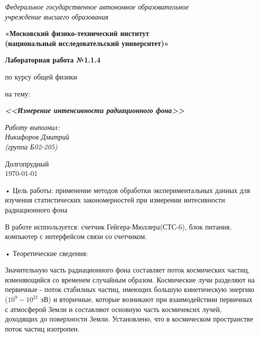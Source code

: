 \documentclass[a4paper,14pt]{extarticle}
\begin{document}
\begin{center}
	\textit{Федеральное государственное автономное образовательное\\ учреждение высшего образования }
	
	\vspace{0.5ex}
	
	\textbf{«Московский физико-технический институт\\ (национальный исследовательский университет)»}
\end{center}

\vspace{10ex}


\begin{center}
	\vspace{13ex}
	
	\textbf{Лабораторная работа №1.1.4}
	
	\vspace{1ex}
	
	по курсу общей физики
	
	на тему:
	
	\textbf{\textit{<<Измерение интенсивности радиационного фона>>}}
	
	\vspace{30ex}
	
	\begin{flushright}
		\noindent
		\textit{Работу выполнил:}\\  
		\textit{Никифоров Дмитрий \\(группа Б02-205)}
	\end{flushright}
	\vfill
	Долгопрудный \\ \today
	
\end{center}

	
	
		• Цель работы: применение методов обработки экспериментальных данных для изучения статистических закономерностей при измерении интесивности радиационного фона
	
	
	В работе исппользуется: счетчик  Гейгера-Мюллера(СТС-6), блок питания, компьютер с интерфейсом связи со счетчиком.
	\newline
	
	• Теоретические сведения:
	\newline
	
	Значительную часть радиационного фона составляет поток космических частиц, изменяющийся со временем случайным образом.
	Космические лучи разделяют на первичные - поток стабилных частиц, имеющих большую кинетическую энергию ($10^{9} - 10^{21}$ эВ) и вторичные, которые возникают при взаимодействии первичных с атмосферой Земли и составляют основную часть космичексих лучей, доходящих до поверхности Земли.
	Установлено, что в космическом пространстве поток частиц изотропен.
	\newline
	
\end{document}
